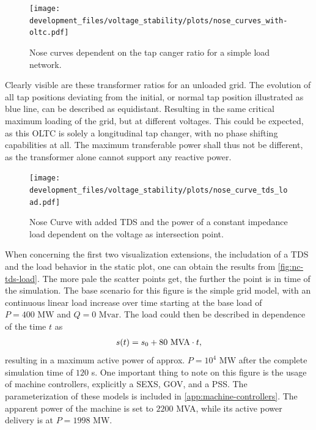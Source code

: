 \begin{figure}[htbp!]
    \centering
    \texttt{[image: development\_files/voltage\_stability/plots/nose\_curves\_with-oltc.pdf]}
    \caption[Nose curves dependent on the tap changer ratio for a simple load network]{Nose curves dependent on the tap canger ratio for a simple load network.}
    \label{fig:oltc-nose-curve}
\end{figure}

Clearly visible are these transformer ratios for an unloaded grid.
The evolution of all tap positions deviating from the initial, or normal tap position illustrated as blue line, can be described as equidistant.
Resulting in the same critical maximum loading of the grid, but at different voltages.
This could be expected, as this \acs{OLTC} is solely a longitudinal tap changer, with no phase shifting capabilities at all.
The maximum transferable power shall thus not be different, as the transformer alone cannot support any reactive power.

\begin{figure}[htbp!]
    \centering
    \texttt{[image: development\_files/voltage\_stability/plots/nose\_curve\_tds\_load.pdf]}
    \caption{Nose Curve with added \acs{TDS} and the power of a constant impedance load dependent on the voltage as intersection point.}
    \label{fig:nc-tds-load}
\end{figure}

When concerning the first two visualization extensions, the includation of a \acs{TDS} and the load behavior in the static plot, one can obtain the results from \autoref{fig:nc-tds-load}.
The more pale the scatter points get, the further the point is in time of the simulation.
The base scenario for this figure is the simple grid model, with an continuous linear load increase over time starting at the base load of $P=400\text{ MW}$ and $Q=0\text{ Mvar}$.
The load could then be described in dependence of the time $t$ as 
\begin{align}
    s(t) = s_0 + 80\text{ MVA} \cdot t \notag,
\end{align}
resulting in a maximum active power of approx. $P=10^4\text{ MW}$ after the complete simulation time of $120$ s.
One important thing to note on this figure is the usage of machine controllers, explicitly a \ac{SEXS}, \ac{GOV}, and a \ac{PSS}.
The parameterization of these models is included in \autoref{app:machine-controllers}.
The apparent power of the machine is set to $2200$ MVA, while its active power delivery is at $P=1998$ MW.


